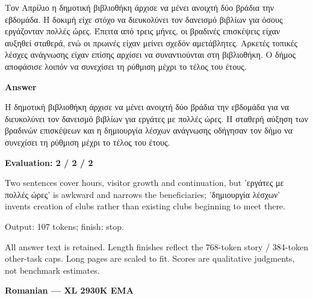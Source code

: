 \documentclass[10pt]{article}
\begin{document}
{\begin{minipage}{\textwidth}
\par\smallskip
Τον Απρίλιο η δημοτική βιβλιοθήκη άρχισε να μένει ανοιχτή δύο βράδια την εβδομάδα. Η δοκιμή είχε στόχο να διευκολύνει τον δανεισμό βιβλίων για όσους εργάζονταν πολλές ώρες. Έπειτα από τρεις μήνες, οι βραδινές επισκέψεις είχαν αυξηθεί σταθερά, ενώ οι πρωινές είχαν μείνει σχεδόν αμετάβλητες. Αρκετές τοπικές λέσχες ανάγνωσης είχαν επίσης αρχίσει να συναντιούνται στη βιβλιοθήκη. Ο δήμος αποφάσισε λοιπόν να συνεχίσει τη ρύθμιση μέχρι το τέλος του έτους.\par\smallskip
\textbf{Answer}\par Η δημοτική βιβλιοθήκη άρχισε να μένει ανοιχτή δύο βράδια την εβδομάδα για να διευκολύνει τον δανεισμό βιβλίων για εργάτες με πολλές ώρες. Η σταθερή αύξηση των βραδινών επισκέψεων και η δημιουργία λέσχων ανάγνωσης οδήγησαν τον δήμο να συνεχίσει τη ρύθμιση μέχρι το τέλος του έτους.\par\smallskip
\textbf{Evaluation: 2 / 2 / 2}\par Two sentences cover hours, visitor growth and continuation, but 'εργάτες με πολλές ώρες' is awkward and narrows the beneficiaries; 'δημιουργία λέσχων' invents creation of clubs rather than existing clubs beginning to meet there.
\par {\color{gray} Output: 107 tokens; finish: stop.}\par
\medskip\footnotesize All answer text is retained. Length finishes reflect the 768-token story / 384-token other-task caps. Long pages are scaled to fit. Scores are qualitative judgments, not benchmark estimates.
\end{minipage}}%
\noindent\ifdim\dimexpr\ht\languagepage+\dp\languagepage\relax>0.93\textheight%
\resizebox*{!}{0.93\textheight}{\usebox{\languagepage}}%
\else\usebox{\languagepage}\fi%
\clearpage
{\Large\bfseries Romanian --- XL 2930K EMA}\par\smallskip
\end{document}
